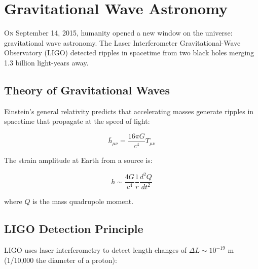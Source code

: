 \documentclass[11pt,a4paper]{article}
\begin{document}
\newpage

\section{Gravitational Wave Astronomy}
\label{sec:gravitationalwaves}

\lettrine[lines=3, loversize=0.1, nindent=0.5em]{O}{n} September 14, 2015, humanity opened a new window on the universe: gravitational wave astronomy. The Laser Interferometer Gravitational-Wave Observatory (LIGO) detected ripples in spacetime from two black holes merging 1.3 billion light-years away.

\subsection{Theory of Gravitational Waves}

Einstein's general relativity predicts that accelerating masses generate ripples in spacetime that propagate at the speed of light:

\begin{equationbox}
\begin{equation}
\bar{h}_{\mu\nu} = \frac{16\pi G}{c^4} T_{\mu\nu}
\label{eq:gw_equation}
\end{equation}
\end{equationbox}

The strain amplitude at Earth from a source is:

\begin{equation}
h \sim \frac{4G}{c^4} \frac{1}{r} \frac{d^2 Q}{dt^2}
\end{equation}

where $Q$ is the mass quadrupole moment.

\subsection{LIGO Detection Principle}

LIGO uses laser interferometry to detect length changes of $\Delta L \sim 10^{-19}$ m (1/10,000 the diameter of a proton):
\end{document}
